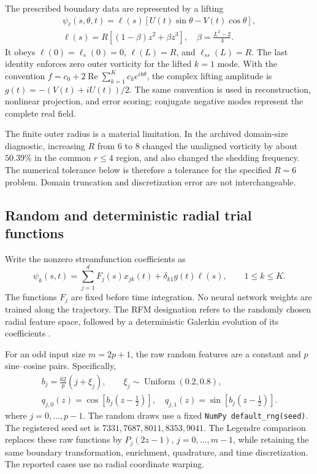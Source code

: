 The prescribed boundary data are represented by a lifting
\begin{equation}
 \begin{gathered}
 \psi_\ell(s,\theta,t)=\ell(s)[U(t)\sin\theta-V(t)\cos\theta],\\
 \ell(s)=R[(1-\beta)z^2+\beta z^3],\quad
 \beta=\frac{L^2-2}{4}.
 \end{gathered}
 \label{eq:lifting}
\end{equation}
It obeys \(\ell(0)=\ell_s(0)=0\), \(\ell(L)=R\), and
\(\ell_{ss}(L)=R\). The last identity enforces zero outer vorticity
for the lifted \(k=1\) mode. With the convention
\(f=c_0+2\operatorname{Re}\sum_{k=1}^{K}c_ke^{ik\theta}\),
the complex lifting amplitude is \(g(t)=-(V(t)+iU(t))/2\).
The same convention is used in reconstruction, nonlinear projection,
and error scoring; conjugate negative modes represent the complete
real field.

The finite outer radius is a material limitation. In the archived
domain-size diagnostic, increasing \(R\) from 6 to 8 changed the
unaligned vorticity by about \(50.39\%\) in the common \(r\leq4\)
region, and also changed the shedding frequency. The numerical
tolerance below is therefore a tolerance for the specified
\(R=6\) problem. Domain truncation and discretization error are not
interchangeable.

\subsection{Random and deterministic radial trial functions}

Write the nonzero streamfunction coefficients as
\begin{equation}
 \psi_k(s,t)=\sum_{j=1}^{d}F_j(s)x_{jk}(t)
                +\delta_{k1}g(t)\ell(s),\qquad 1\leq k\leq K.
 \label{eq:trial-expansion}
\end{equation}
The functions \(F_j\) are fixed before time integration. No neural
network weights are trained along the trajectory. The RFM designation
refers to the randomly chosen radial feature space, followed by a
deterministic Galerkin evolution of its coefficients \cite{r1,r2,r3}.

For an odd input size \(m=2p+1\), the raw random features are a constant
and \(p\) sine--cosine pairs. Specifically,
\begin{equation}
 \begin{gathered}
 b_j=\frac{62}{p}(j+\xi_j),\qquad
 \xi_j\sim\operatorname{Uniform}(0.2,0.8),\\
 q_{j,0}(z)=\cos[b_j(z-\tfrac12)],\quad
 q_{j,1}(z)=\sin[b_j(z-\tfrac12)].
 \end{gathered}
 \label{eq:random-features}
\end{equation}
where \(j=0,\ldots,p-1\). The random draws use a fixed
\texttt{NumPy default\_rng(seed)}. The registered seed set is
\(7331,7687,8011,8353,9041\). The Legendre comparison replaces these
raw functions by \(P_j(2z-1)\), \(j=0,\ldots,m-1\), while retaining
the same boundary transformation, enrichment, quadrature, and time
discretization. The reported cases use no radial coordinate warping.

